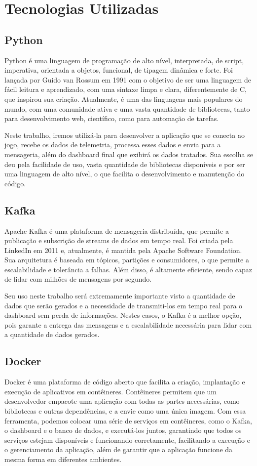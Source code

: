 \documentclass[12pt, %
openright, 
oneside, %
a4paper,    %
brazil]{facom-ufu-abntex2}
\begin{document}
\section{Tecnologias Utilizadas}

\subsection{Python}
Python é uma linguagem de programação de alto nível, interpretada, de script, imperativa, orientada a objetos, funcional, de tipagem dinâmica e forte.
Foi lançada por Guido van Rossum em 1991 com o objetivo de ser uma linguagem de fácil leitura e aprendizado, com uma sintaxe limpa e clara, diferentemente de C, que inspirou sua criação.
Atualmente, é uma das linguagens mais populares do mundo, com uma comunidade ativa e uma vasta quantidade de bibliotecas, tanto para desenvolvimento web, científico, como para automação de tarefas.

Neste trabalho, iremos utilizá-la para desenvolver a aplicação que se conecta ao jogo, recebe os dados de telemetria, processa esses dados e envia para a mensageria, além do dashboard final que exibirá os dados tratados.
Sua escolha se deu pela facilidade de uso, vasta quantidade de bibliotecas disponíveis e por ser uma linguagem de alto nível, o que facilita o desenvolvimento e manutenção do código.

\subsection{Kafka}
Apache Kafka é uma plataforma de mensageria distribuída, que permite a publicação e subscrição de streams de dados em tempo real. Foi criada pela LinkedIn em 2011 e, atualmente, é mantida pela Apache Software Foundation.
Sua arquitetura é baseada em tópicos, partições e consumidores, o que permite a escalabilidade e tolerância a falhas. Além disso, é altamente eficiente, sendo capaz de lidar com milhões de mensagens por segundo.

Seu uso neste trabalho será extremamente importante visto a quantidade de dados que serão gerados e a necessidade de transmiti-los em tempo real para o dashboard sem perda de informações.
Nestes casos, o Kafka é a melhor opção, pois garante a entrega das mensagens e a escalabilidade necessária para lidar com a quantidade de dados gerados.

\subsection{Docker}
Docker é uma plataforma de código aberto que facilita a criação, implantação e execução de aplicativos em contêineres. Contêineres permitem que um desenvolvedor empacote uma aplicação com todas as partes necessárias, como bibliotecas e outras dependências, e a envie como uma única imagem.
Com essa ferramenta, podemos colocar uma série de serviços em contêineres, como o Kafka, o dashboard e o banco de dados, e executá-los juntos, garantindo que todos os serviços estejam disponíveis e funcionando corretamente, facilitando a execução e o gerenciamento da aplicação,
além de garantir que a aplicação funcione da mesma forma em diferentes ambientes.
\end{document}
